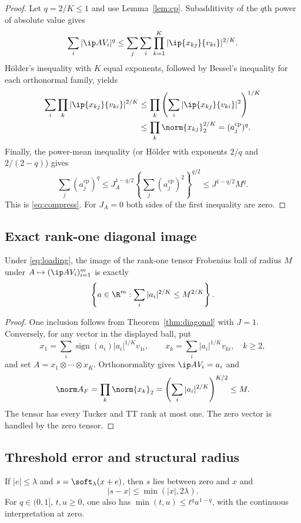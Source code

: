 \begin{proof}
Let $q=2/K\le1$ and use Lemma~\ref{lem:cp}. Subadditivity of the $q$th power of absolute value gives
\[
 \sum_i|\ip A{V_i}|^q
 \le\sum_j\sum_i\prod_{k=1}^K|\ip{x_{kj}}{v_{ki}}|^{2/K}.
\]
H\"older's inequality with $K$ equal exponents, followed by Bessel's inequality for each orthonormal family, yields
\begin{align*}
 \sum_i\prod_k|\ip{x_{kj}}{v_{ki}}|^{2/K}
 &\le\prod_k\left(\sum_i|\ip{x_{kj}}{v_{ki}}|^2\right)^{1/K}\\
 &\le\prod_k\norm{x_{kj}}_2^{2/K}=(a_j^{\mathrm{cp}})^q.
\end{align*}
Finally, the power-mean inequality (or H\"older with exponents $2/q$ and $2/(2-q)$) gives
\[
 \sum_j(a_j^{\mathrm{cp}})^q
 \le J_A^{1-q/2}\left\{\sum_j(a_j^{\mathrm{cp}})^2\right\}^{q/2}
 \le J^{1-q/2}M^q.
\]
This is \eqref{eq:compress}. For $J_A=0$ both sides of the first inequality are zero.
\end{proof}

\subsection{Exact rank-one diagonal image}

\begin{lemma}\label{lem:image}
Under \eqref{eq:loading}, the image of the rank-one tensor Frobenius ball of radius $M$ under $A\mapsto(\ip A{V_i})_{i=1}^m$ is exactly
\[
 \left\{a\in\R^m:\sum_i|a_i|^{2/K}\le M^{2/K}\right\}.
\]
\end{lemma}

\begin{proof}
One inclusion follows from Theorem~\ref{thm:diagonal} with $J=1$. Conversely, for any vector in the displayed ball, put
\[
 x_1=\sum_i\operatorname{sign}(a_i)|a_i|^{1/K}v_{1i},\qquad
 x_k=\sum_i|a_i|^{1/K}v_{ki},\quad k\ge2,
\]
and set $A=x_1\otimes\cdots\otimes x_K$. Orthonormality gives $\ip A{V_i}=a_i$ and
\[
 \norm A_F=\prod_k\norm{x_k}_2
 =\left(\sum_i|a_i|^{2/K}\right)^{K/2}\le M.
\]
The tensor has every Tucker and TT rank at most one. The zero vector is handled by the zero tensor.
\end{proof}

\subsection{Threshold error and structural radius}

\begin{lemma}\label{lem:soft}
If $|e|\le\lambda$ and $s=\soft_\lambda(x+e)$, then $s$ lies between zero and $x$ and
\[
 |s-x|\le\min(|x|,2\lambda).
\]
For $q\in(0,1]$, $t,u\ge0$, one also has $\min(t,u)\le t^q u^{1-q}$, with the continuous interpretation at zero.
\end{lemma}

